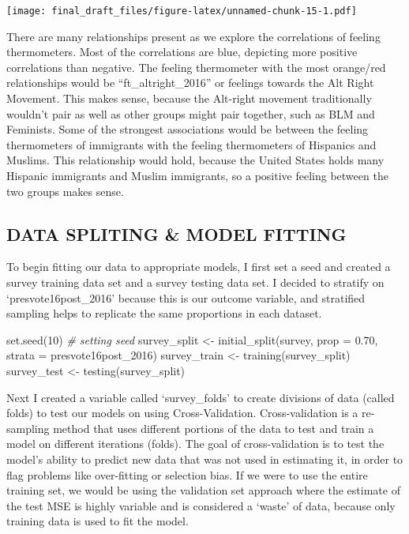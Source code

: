 \documentclass[
]{article}
\newenvironment{Shaded}{\begin{snugshade}}{\end{snugshade}}
\newcommand{\AttributeTok}[1]{\textcolor[rgb]{0.77,0.63,0.00}{#1}}
\newcommand{\CommentTok}[1]{\textcolor[rgb]{0.56,0.35,0.01}{\textit{#1}}}
\newcommand{\DecValTok}[1]{\textcolor[rgb]{0.00,0.00,0.81}{#1}}
\newcommand{\FloatTok}[1]{\textcolor[rgb]{0.00,0.00,0.81}{#1}}
\newcommand{\FunctionTok}[1]{\textcolor[rgb]{0.00,0.00,0.00}{#1}}
\newcommand{\NormalTok}[1]{#1}
\newcommand{\OtherTok}[1]{\textcolor[rgb]{0.56,0.35,0.01}{#1}}
\begin{document}
\texttt{[image: final\_draft\_files/figure-latex/unnamed-chunk-15-1.pdf]}

There are many relationships present as we explore the correlations of
feeling thermometers. Most of the correlations are blue, depicting more
positive correlations than negative. The feeling thermometer with the
most orange/red relationships would be ``ft\_altright\_2016'' or
feelings towards the Alt Right Movement. This makes sense, because the
Alt-right movement traditionally wouldn't pair as well as other groups
might pair together, such as BLM and Feminists. Some of the strongest
associations would be between the feeling thermometers of immigrants
with the feeling thermometers of Hispanics and Muslims. This
relationship would hold, because the United States holds many Hispanic
immigrants and Muslim immigrants, so a positive feeling between the two
groups makes sense.

\hypertarget{data-spliting-model-fitting}{%
\subsection{DATA SPLITING \& MODEL
FITTING}\label{data-spliting-model-fitting}}

To begin fitting our data to appropriate models, I first set a seed and
created a survey training data set and a survey testing data set. I
decided to stratify on `presvote16post\_2016' because this is our
outcome variable, and stratified sampling helps to replicate the same
proportions in each dataset.

\begin{Shaded}
\begin{Highlighting}[]
\FunctionTok{set.seed}\NormalTok{(}\DecValTok{10}\NormalTok{) }\CommentTok{\# setting seed}
\NormalTok{survey\_split }\OtherTok{\textless{}{-}} \FunctionTok{initial\_split}\NormalTok{(survey, }\AttributeTok{prop =} \FloatTok{0.70}\NormalTok{,}
                                \AttributeTok{strata =}\NormalTok{ presvote16post\_2016)}
\NormalTok{survey\_train }\OtherTok{\textless{}{-}} \FunctionTok{training}\NormalTok{(survey\_split)}
\NormalTok{survey\_test }\OtherTok{\textless{}{-}} \FunctionTok{testing}\NormalTok{(survey\_split)}
\end{Highlighting}
\end{Shaded}

Next I created a variable called `survey\_folds' to create divisions of
data (called folds) to test our models on using Cross-Validation.
Cross-validation is a re-sampling method that uses different portions of
the data to test and train a model on different iterations (folds). The
goal of cross-validation is to test the model's ability to predict new
data that was not used in estimating it, in order to flag problems like
over-fitting or selection bias. If we were to use the entire training
set, we would be using the validation set approach where the estimate of
the test MSE is highly variable and is considered a `waste' of data,
because only training data is used to fit the model.
\end{document}
